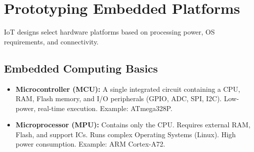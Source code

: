 \documentclass[12pt,a4paper]{article}
\begin{document}
\section{Prototyping Embedded Platforms}

IoT designs select hardware platforms based on processing power, OS requirements, and connectivity.

\subsection{Embedded Computing Basics}
\begin{itemize}[leftmargin=*, itemsep=3pt]
  \item \textbf{Microcontroller (MCU):} A single integrated circuit containing a CPU, RAM, Flash memory, and I/O peripherals (GPIO, ADC, SPI, I2C). Low-power, real-time execution. Example: ATmega328P.
  \item \textbf{Microprocessor (MPU):} Contains only the CPU. Requires external RAM, Flash, and support ICs. Runs complex Operating Systems (Linux). High power consumption. Example: ARM Cortex-A72.
\end{itemize}
\end{document}
